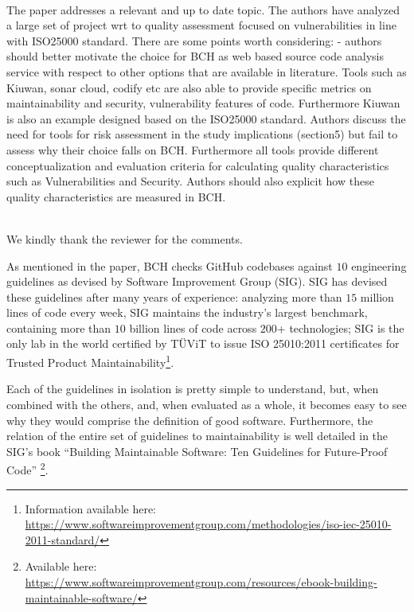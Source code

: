 \documentclass[11pt,fleqn]{article}
\newcommand{\eline}{\vspace*{.75\baselineskip}}
\newcommand{\Referee}[1]{\eline \noindent {\bf Reviewer comment #1:} \\}
\newcommand{\Us}{\eline \noindent {\bf Response:}\\}
\newenvironment{revcomment}[1][]
{\Referee{#1}\begin{rcomment}}
{\end{rcomment}}
\begin{document}
\begin{revcomment}[3.1]

    The paper addresses a relevant and up to date topic. 
    The authors have analyzed a large set of project wrt to 
    quality assessment focused on vulnerabilities in line with 
    ISO25000 standard. There are some points worth considering: 
    - authors should better motivate the choice for BCH as web 
    based source code analysis service with respect to other 
    options that are available in literature. Tools such as Kiuwan, 
    sonar cloud, codify etc are also able to provide specific metrics 
    on maintainability and security, vulnerability features of code. 
    Furthermore Kiuwan is also an example designed based on the ISO25000 
    standard. Authors discuss the need for tools for risk assessment in 
    the study implications (section5) but fail to assess why their choice 
    falls on BCH. Furthermore all tools provide different conceptualization 
    and evaluation criteria for calculating quality characteristics such as Vulnerabilities 
    and Security. Authors should also explicit how these quality characteristics are measured in BCH. 

\end{revcomment}

\Us We kindly thank the reviewer for the comments. 

As mentioned in the paper, BCH checks GitHub codebases against $10$ engineering 
guidelines as devised by Software Improvement Group (SIG). SIG has devised 
these guidelines after many years of experience: analyzing more than $15$ million 
lines of code every week, SIG maintains the industry’s largest 
benchmark, containing more than $10$ billion lines of code across $200$+ 
technologies; SIG is the only lab in the world certified by TÜViT to issue ISO 25010:2011
certificates for Trusted Product Maintainability\footnote{Information available here: 
\url{https://www.softwareimprovementgroup.com/methodologies/iso-iec-25010-2011-standard/}}.

Each of the guidelines in isolation is pretty simple to understand, but, when 
combined with the others, and, when evaluated as a whole, it becomes easy to see why 
they would comprise the definition of good software. Furthermore, the relation of the entire set of
guidelines to maintainability is well detailed in the SIG's book ``Building Maintainable 
Software: Ten Guidelines for Future-Proof Code''
\footnote{Available here: 
\url{https://www.softwareimprovementgroup.com/resources/ebook-building-maintainable-software/}}.
\end{document}

